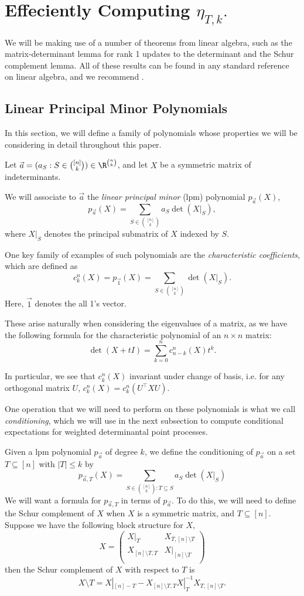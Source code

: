 \section{Effeciently Computing $\eta_{T, k}.$}
We will be making use of a number of theorems from linear algebra, such as the matrix-determinant lemma for rank 1 updates to the determinant and the Schur complement lemma.
All of these results can be found in any standard reference on linear algebra, and we recommend \cite{horn2012matrix}.
\subsection{Linear Principal Minor Polynomials}
In this section, we will define a family of polynomials whose properties we will be considering in detail throughout this paper.

Let $\vec{a} = (a_S : S \in \binom{[n]}{k}) \in \R^{\binom{n}{k}}$, and let $X$ be a symmetric matrix of indeterminants.

We will associate to $\vec{a}$ the \emph{linear principal minor} (lpm) polynomial $p_{\vec{a}}(X)$,
\[
    p_{\vec{a}}(X) = \sum_{S \in \binom{[n]}{k}} a_S\det(X|_S),
\]
where $X|_S$ denotes the principal submatrix of $X$ indexed by $S$.

One key family of examples of such polynomials are the \emph{characteristic coefficients}, which are defined as
\[
    c_k^n(X) = p_{\vec{1}}(X) = \sum_{S \in \binom{[n]}{k}} \det(X|_S).
\]
Here, $\vec{1}$ denotes the all 1's vector.

These arise naturally when considering the eigenvalues of a matrix, as we have the following formula for the characteristic polynomial of an $n\times n$ matrix:
\[
    \det(X + tI) = \sum_{k=0}^n c_{n-k}^n(X) t^k.
\]

In particular, we see that $c_k^n(X)$ invariant under change of basis, i.e. for any orthogonal matrix $U$, $c_k^n(X) = c_k^n(U^{\intercal}XU)$.

One operation that we will need to perform on these polynomials is what we call \emph{conditioning}, which we will use in the next subsection to compute conditional expectations for weighted determinantal point processes.

Given a lpm polynomial $p_{\vec{a}}$ of degree $k$, we define the conditioning of $p_{\vec{a}}$ on a set $T \subseteq [n]$ with $|T| \le k$ by
\[
    p_{\vec{a}, T}(X) = \sum_{S \in \binom{[n]}{k} : T \subseteq S} a_S \det(X|_S)
\]
We will want a formula for $p_{\vec{a}, T}$ in terms of $p_{\vec{a}}$.
To do this, we will need to define the Schur complement of $X$ when $X$ is a symmetric matrix, and $T \subseteq [n]$. Suppose we have the following block structure for $X$,
\[
    X = 
    \begin{pmatrix}
        X|_T & X_{T, [n] \setminus T}\\
        X_{[n] \setminus T, T} & X|_{[n] \setminus T}\\
    \end{pmatrix}
\]
then the Schur complement of $X$ with respect to $T$ is
\[
    X \setminus T = X|_{[n]  - T} -  X_{[n] \setminus T, T} X|_{T}^{-1}X_{T, [n] \setminus T}.
\]

